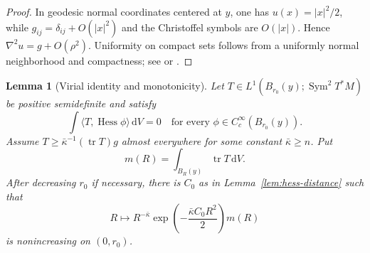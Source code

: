 \documentclass[11pt,reqno]{amsart}
\newtheorem{lemma}[theorem]{Lemma}
\theoremstyle{definition}
\theoremstyle{remark}
\newcommand{\tr}{\operatorname{tr}}
\newcommand{\Hess}{\operatorname{Hess}}
\newcommand{\dd}{\,\mathrm d}
\newcommand{\abs}[1]{\lvert #1\rvert}
\newcommand{\inner}[2]{\langle #1,#2\rangle}
\begin{document}
\begin{proof}
In geodesic normal coordinates centered at $y$, one has $u(x)=\abs{x}^2/2$, while $g_{ij}=\delta_{ij}+O(\abs{x}^2)$ and the Christoffel symbols are $O(\abs{x})$.  Hence $\nabla^2u=g+O(\rho^2)$.  Uniformity on compact sets follows from a uniformly normal neighborhood and compactness; see \cite[Chapter 6]{Lee} or \cite[Chapter 3]{doCarmo}.
\end{proof}

\begin{lemma}[Virial identity and monotonicity]\label{lem:virial}
Let $T\in L^1(B_{r_0}(y);\operatorname{Sym}^2T^*M)$ be positive semidefinite and satisfy
\[
\int\inner{T}{\Hess\phi}\dd V=0
\quad\text{for every }\phi\in C_c^\infty(B_{r_0}(y)).
\]
Assume $T\ge\bar\kappa^{-1}(\tr T)g$ almost everywhere for some constant $\bar\kappa\ge n$.  Put
\[
m(R)=\int_{B_R(y)}\tr T\dd V.
\]
After decreasing $r_0$ if necessary, there is $C_0$ as in Lemma~\ref{lem:hess-distance} such that
\begin{equation}\label{eq:monotone-quantity}
R\longmapsto R^{-\bar\kappa}
\exp\!\left(-\frac{\bar\kappa C_0R^2}{2}\right)m(R)
\end{equation}
is nonincreasing on $(0,r_0)$.
\end{lemma}
\end{document}
